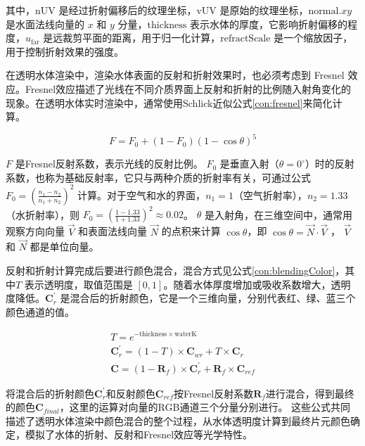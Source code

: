 其中，$\text{nUV}$ 是经过折射偏移后的纹理坐标，$\text{vUV}$ 是原始的纹理坐标，$\text{normal}.xy$ 是水面法线向量的 $x$ 和 $y$ 分量，$\text{thickness}$ 表示水体的厚度，它影响折射偏移的程度，$u_{\text{far}}$ 是远裁剪平面的距离，用于归一化计算，$\text{refractScale}$ 是一个缩放因子，用于控制折射效果的强度。

在透明水体渲染中，渲染水体表面的反射和折射效果时，也必须考虑到 Fresnel 效应。Fresnel效应描述了光线在不同介质界面上反射和折射的比例随入射角变化的现象。在透明水体实时渲染中，通常使用Schlick近似公式\ref{con:fresnel}来简化计算。

\begin{equation}
    F = F_0+(1 - F_0)(1 - \cos\theta)^5
    \label{con:fresnel}
\end{equation}

$F$ 是Fresnel反射系数，表示光线的反射比例。
$F_0$ 是垂直入射（$\theta = 0^{\circ}$）时的反射系数，也称为基础反射率，它只与两种介质的折射率有关，可通过公式 $F_0=\left(\frac{n_1 - n_2}{n_1 + n_2}\right)^2$ 计算。对于空气和水的界面，$n_1 = 1$（空气折射率），$n_2 = 1.33$（水折射率），则 $F_0=\left(\frac{1 - 1.33}{1 + 1.33}\right)^2\approx0.02$。
$\theta$ 是入射角，在三维空间中，通常用观察方向向量 $\vec{V}$ 和表面法线向量 $\vec{N}$ 的点积来计算 $\cos\theta$，即 $\cos\theta=\vec{N}\cdot\vec{V}$ ， $\vec{V}$ 和 $\vec{N}$ 都是单位向量。

反射和折射计算完成后要进行颜色混合，混合方式见公式\ref{con:blendingColor}，其中$T$ 表示透明度，取值范围是 $[0, 1]$。随着水体厚度增加或吸收系数增大，透明度降低。$\mathbf{C}_{r}^{'}$ 是混合后的折射颜色，它是一个三维向量，分别代表红、绿、蓝三个颜色通道的值。

\begin{equation}
    \begin{aligned}
    T = e^{- \text{thickness} \times \text{waterK}} \\
    \mathbf{C}_{r}^{'}=(1 - T)\times\mathbf{C}_{wr}+T\times\mathbf{C}_{r}\\
    \mathbf{C}=(1 - \mathbf{R}_{f})\times\mathbf{C}_{r}^{'}+\mathbf{R}_{f}\times\mathbf{C}_{ref}
    \end{aligned}
    \label{con:blendingColor}
\end{equation}

将混合后的折射颜色$\mathbf{C}_{r}^{'}$和反射颜色$\mathbf{C}_{ref}$按Fresnel反射系数$\mathbf{R}_{f}$进行混合，得到最终的颜色$\mathbf{C}_{final}$，这里的运算对向量的RGB通道三个分量分别进行。
这些公式共同描述了透明水体渲染中颜色混合的整个过程，从水体透明度计算到最终片元颜色确定，模拟了水体的折射、反射和Fresnel效应等光学特性。

